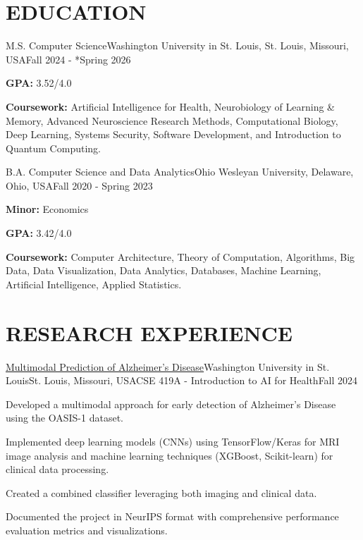 \section{EDUCATION}

\begin{educationentry}{M.S. Computer Science}{Washington University in St. Louis, St. Louis, Missouri, USA}{Fall 2024 - *Spring 2026}
    \item \textbf{GPA:} 3.52/4.0
    \item \textbf{Coursework:}  Artificial Intelligence for Health, Neurobiology of Learning \& Memory, Advanced Neuroscience Research Methods, Computational Biology, Deep Learning, Systems Security, Software Development, and Introduction to Quantum Computing.
\end{educationentry}

\begin{educationentry}{B.A. Computer Science and Data Analytics}{Ohio Wesleyan University, Delaware, Ohio, USA}{Fall 2020 - Spring 2023}
    \item \textbf{Minor:} Economics
    \item \textbf{GPA:} 3.42/4.0
    \item \textbf{Coursework:} Computer Architecture, Theory of Computation, Algorithms, Big Data, Data Visualization, Data Analytics, Databases, Machine Learning, Artificial Intelligence, Applied Statistics.
\end{educationentry}

\vspace{\headerSpacing}
\section{RESEARCH EXPERIENCE}

\begin{researchentry}{\href{https://github.com/agopalareddy/CSE419A_Multimodal_Prediction_of_Alzheimers}{Multimodal Prediction of Alzheimer's Disease}}{Washington University in St. Louis}{St. Louis, Missouri, USA}{CSE 419A - Introduction to AI for Health}{Fall 2024}
    \item Developed a multimodal approach for early detection of Alzheimer's Disease using the OASIS-1 dataset.
    \item Implemented deep learning models (CNNs) using TensorFlow/Keras for MRI image analysis and machine learning techniques (XGBoost, Scikit-learn) for clinical data processing.
    \item Created a combined classifier leveraging both imaging and clinical data.
    \item Documented the project in NeurIPS format with comprehensive performance evaluation metrics and visualizations.
\end{researchentry}

